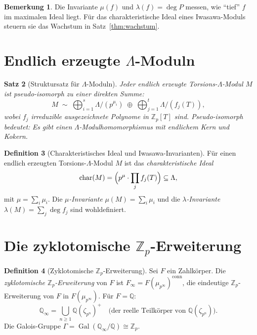 \documentclass[12pt,a4paper]{amsart}
\newtheorem{theorem}{Satz}[section]
\theoremstyle{definition}
\newtheorem{definition}[theorem]{Definition}
\newtheorem{remark}[theorem]{Bemerkung}
\newcommand{\Q}{\mathbb{Q}}
\newcommand{\Zp}{\mathbb{Z}_p}
\DeclareMathOperator{\Gal}{Gal}
\begin{document}
\begin{remark}
Die Invariante $\mu(f)$ und $\lambda(f) = \deg P$ messen, wie ``tief''
$f$ im maximalen Ideal liegt.  Für das charakteristische Ideal eines
Iwasawa-Moduls steuern sie das Wachstum in Satz~\ref{thm:wachstum}.
\end{remark}

\section{Endlich erzeugte $\Lambda$-Moduln}

\begin{theorem}[Struktursatz für $\Lambda$-Moduln]
\label{thm:struktur}
Jeder endlich erzeugte Torsions-$\Lambda$-Modul $M$ ist pseudo-isomorph
zu einer direkten Summe:
\[
  M \;\sim\; \bigoplus_{i=1}^s \Lambda/(p^{\mu_i}) \;\oplus\;
             \bigoplus_{j=1}^t \Lambda/(f_j(T)),
\]
wobei $f_j$ irreduzible ausgezeichnete Polynome in $\Zp[T]$ sind.
\emph{Pseudo-isomorph} bedeutet: Es gibt einen $\Lambda$-Modulhomomorphismus
mit endlichem Kern und Kokern.
\end{theorem}

\begin{definition}[Charakteristisches Ideal und Iwasawa-Invarianten]
\label{def:char_ideal}
Für einen endlich erzeugten Torsions-$\Lambda$-Modul $M$ ist das
\emph{charakteristische Ideal}
\[
  \mathrm{char}(M) = \Bigl(p^{\mu} \cdot \prod_j f_j(T)\Bigr) \subseteq \Lambda,
\]
mit $\mu = \sum_i \mu_i$.
Die \emph{$\mu$-Invariante} $\mu(M) = \sum_i \mu_i$ und die
\emph{$\lambda$-Invariante} $\lambda(M) = \sum_j \deg f_j$ sind
wohldefiniert.
\end{definition}

\section{Die zyklotomische $\Zp$-Erweiterung}

\begin{definition}[Zyklotomische $\Zp$-Erweiterung]
\label{def:zyklotom_erw}
Sei $F$ ein Zahlkörper.  Die \emph{zyklotomische $\Zp$-Erweiterung}
von $F$ ist $F_\infty = F(\mu_{p^\infty})^{\mathrm{conn}}$, die eindeutige
$\Zp$-Erweiterung von $F$ in $F(\mu_{p^\infty})$.  Für $F = \Q$:
\[
  \Q_\infty = \bigcup_{n \ge 1} \Q(\zeta_{p^n})^+
  \quad\text{(der reelle Teilkörper von $\Q(\zeta_{p^n})$)}.
\]
Die Galois-Gruppe $\Gamma = \Gal(\Q_\infty/\Q) \cong \Zp$.
\end{definition}
\end{document}
